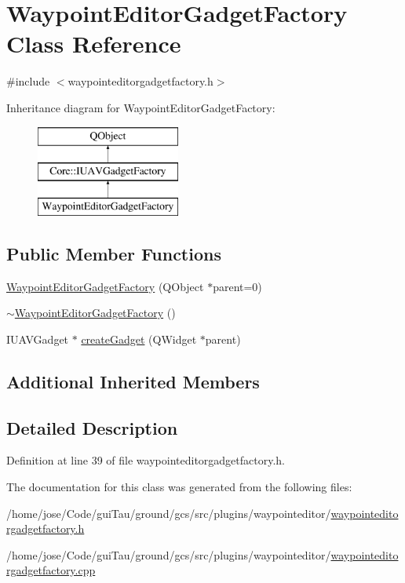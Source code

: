 \hypertarget{class_waypoint_editor_gadget_factory}{\section{Waypoint\-Editor\-Gadget\-Factory Class Reference}
\label{class_waypoint_editor_gadget_factory}
}


{\ttfamily \#include $<$waypointeditorgadgetfactory.\-h$>$}

Inheritance diagram for Waypoint\-Editor\-Gadget\-Factory\-:\begin{figure}[H]
\begin{center}
\leavevmode
\includegraphics[height=3.000000cm]{class_waypoint_editor_gadget_factory}
\end{center}
\end{figure}
\subsection*{Public Member Functions}
\begin{DoxyCompactItemize}
\item 
\hyperlink{group___waypoint_editor_gadget_plugin_ga270c7e089d8d3807f3f5039dd3191327}{Waypoint\-Editor\-Gadget\-Factory} (Q\-Object $\ast$parent=0)
\item 
\hyperlink{group___waypoint_editor_gadget_plugin_ga07a37c82dbc7c93b742ed17eac5b6ce4}{$\sim$\-Waypoint\-Editor\-Gadget\-Factory} ()
\item 
I\-U\-A\-V\-Gadget $\ast$ \hyperlink{group___waypoint_editor_gadget_plugin_ga542eee5447d62625cd21c9f57e20a8cb}{create\-Gadget} (Q\-Widget $\ast$parent)
\end{DoxyCompactItemize}
\subsection*{Additional Inherited Members}


\subsection{Detailed Description}


Definition at line 39 of file waypointeditorgadgetfactory.\-h.



The documentation for this class was generated from the following files\-:\begin{DoxyCompactItemize}
\item 
/home/jose/\-Code/gui\-Tau/ground/gcs/src/plugins/waypointeditor/\hyperlink{waypointeditorgadgetfactory_8h}{waypointeditorgadgetfactory.\-h}\item 
/home/jose/\-Code/gui\-Tau/ground/gcs/src/plugins/waypointeditor/\hyperlink{waypointeditorgadgetfactory_8cpp}{waypointeditorgadgetfactory.\-cpp}\end{DoxyCompactItemize}
